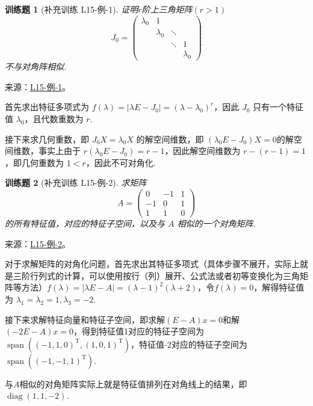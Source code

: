 \documentclass[12pt,fontset=fandol]{ctexart}
\newtheorem{exercise}{训练题}[section]
\begin{document}
\begin{exercise}[补充训练 L15-例-1]\label{prob:L15-例-1}
证明$r$阶上三角矩阵$(r>1)$
    \[J_0=\begin{pmatrix}
            \lambda_0 & 1         &        &           \\
                      & \lambda_0 & \ddots &           \\
                      &           & \ddots & 1         \\
                      &           &        & \lambda_0
        \end{pmatrix}\]
    不与对角阵相似.
\end{exercise}
\noindent 来源：\href{https://github.com/yhwu-is/Linear-Algebra-Left-Undone/blob/new/%E8%AE%B2%E4%B9%89/%E4%B8%93%E9%A2%98/15%20%E7%9B%B8%E4%BC%BC%E6%A0%87%E5%87%86%E5%BD%A2%EF%BC%9A%E5%A4%8D%E6%95%B0%E5%9F%9F%E4%B8%8A%E7%9A%84%E5%B0%9D%E8%AF%95%E4%B8%8E%E7%90%86%E8%AE%BA.tex}{L15-例-1}。
\begin{solve}
首先求出特征多项式为 $f(\lambda) = |\lambda E - J_0| = (\lambda - \lambda_0)^r$，因此 $J_0$ 只有一个特征值 $\lambda_0$，且代数重数为 $r$.

    接下来求几何重数，即 $J_0X = \lambda_0X$ 的解空间维数，即 $(\lambda_0 E - J_0)X = 0$的解空间维数，事实上由于 $r(\lambda_0 E - J_0) = r - 1$，因此解空间维数为 $r - (r - 1) = 1$，即几何重数为 $1 < r$，因此不可对角化.
\end{solve}

\begin{exercise}[补充训练 L15-例-2]\label{prob:L15-例-2}
求矩阵
    \[A=\begin{pmatrix}
            0  & -1 & 1 \\
            -1 & 0  & 1 \\
            1  & 1  & 0
        \end{pmatrix}\]
    的所有特征值，对应的特征子空间，以及与 $A$ 相似的一个对角矩阵.
\end{exercise}
\noindent 来源：\href{https://github.com/yhwu-is/Linear-Algebra-Left-Undone/blob/new/%E8%AE%B2%E4%B9%89/%E4%B8%93%E9%A2%98/15%20%E7%9B%B8%E4%BC%BC%E6%A0%87%E5%87%86%E5%BD%A2%EF%BC%9A%E5%A4%8D%E6%95%B0%E5%9F%9F%E4%B8%8A%E7%9A%84%E5%B0%9D%E8%AF%95%E4%B8%8E%E7%90%86%E8%AE%BA.tex}{L15-例-2}。
\begin{solve}
对于求解矩阵的对角化问题，首先求出其特征多项式（具体步骤不展开，实际上就是三阶行列式的计算，可以使用按行（列）展开、公式法或者初等变换化为三角矩阵等方法）$f(\lambda)=|\lambda E-A|=(\lambda-1)^2(\lambda+2)$，令$f(\lambda)=0$，解得特征值为 $\lambda_1=\lambda_2=1,\lambda_3=-2$.

    接下来求解特征向量和特征子空间，即求解$(E-A)x=0$和解$(-2E-A)x=0$，得到特征值1对应的特征子空间为$\operatorname{span}((-1,1,0)^{\mathrm{T}},(1,0,1)^{\mathrm{T}})$，特征值-2对应的特征子空间为$\operatorname{span}((-1,-1,1)^{\mathrm{T}})$.

    与$A$相似的对角矩阵实际上就是特征值排列在对角线上的结果，即 $\operatorname{diag}(1,1,-2)$.
\end{solve}
\end{document}
